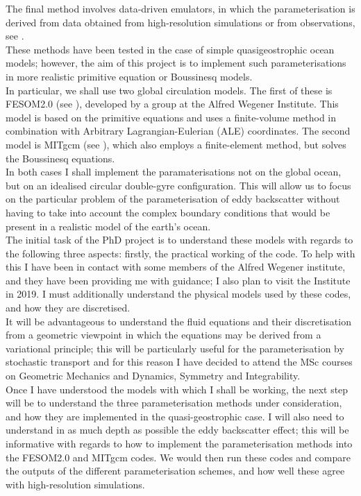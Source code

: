 \documentclass[11pt]{article}
\begin{document}
		\indnt The final method involves data-driven emulators, in which the parameterisation is derived from data obtained from high-resolution simulations or from observations, see \cite{vii}. \\
		\linebreak
		These methods have been tested in the case of simple quasigeostrophic ocean models; however, the aim of this project is to implement such parameterisations in more realistic primitive equation or Boussinesq models. \\
		 \indnt In particular, we shall use two global circulation models. The first of these is FESOM2.0 (see \cite{v}), developed by a group at the Alfred Wegener Institute. This model is based on the primitive equations and uses a finite-volume method in combination with Arbitrary Lagrangian-Eulerian (ALE) coordinates. The second model is MITgcm (see \cite{vi}), which also employs a finite-element method, but solves the Boussinesq equations.\\
		 \indnt In both cases I shall implement the paramaterisations not on the global ocean, but on an idealised circular double-gyre configuration. This will allow us to focus on the particular problem of the parameterisation of eddy backscatter without having to take into account the complex boundary conditions that would be present in a realistic model of the earth's ocean.\\
		 \linebreak
		   The initial task of the PhD project is to understand these models with regards to the following three aspects: firstly, the practical working of the code. To help with this I have been in contact with some members of the Alfred Wegener institute, and they have been providing me with guidance; I also plan to visit the Institute in 2019.  I must additionally understand the physical models used by these codes, and how they are discretised.  \\
		 \indnt It will be advantageous to understand the fluid equations and their discretisation from a geometric viewpoint in which the equations may be derived from a variational principle; this will be particularly useful for the parameterisation by stochastic transport and for this reason I have decided to attend the MSc courses on Geometric Mechanics and Dynamics, Symmetry and Integrability. \\
		\indnt  Once I have understood the models with which I shall be working, the next step will be to understand the three parameterisation methods under consideration, and how they are implemented in the quasi-geostrophic case. I will also need to understand in as much depth as possible the eddy backscatter effect; this will be informative with regards to how to implement the parameterisation methods into the FESOM2.0 and MITgcm codes. We would then run these codes and compare the outputs of the different parameterisation schemes, and how well these agree with high-resolution simulations.\\
\end{document}
